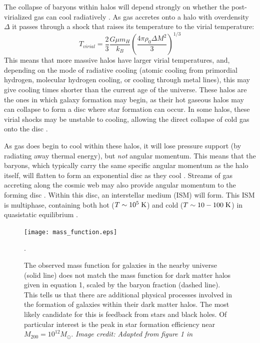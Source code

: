 The collapse of baryons within halos will depend strongly on whether the
post-virialized gas can cool radiatively \citep{Rees1977}.  As gas accretes onto
a halo with overdensity $\Delta$ it passes through a shock that raises its
temperature to the virial temperature:
\begin{equation}
    T_{virial} = \frac{2}{3}\frac{G\mu m_H}{k_B}\left({\frac{4\pi\rho_0\Delta
    M^2}{3}}\right)^{1/3}
\end{equation}
This means that more massive halos have larger virial temperatures, and,
depending on the mode of radiative cooling (atomic cooling from primordial
hydrogen, molecular hydrogen cooling, or cooling through metal lines), this may
give cooling times shorter than the current age of the universe.  These halos 
are the ones in which galaxy formation may begin, as their hot gaseous halos may
can collapse to form a disc where star formation can occur.  In some halos,
these virial shocks may be unstable to cooling, allowing the direct collapse of
cold gas onto the disc \citep{Birnboim2003}.  


As gas does begin to cool within these halos, it will lose pressure support (by
radiating away thermal energy), but {\it not} angular momentum.  This means that
the baryons, which typically carry the same specific angular momentum as the
halo itself, will flatten to form an exponential disc as they cool
\citep{Fall1980,Mo1998}.  Streams of gas accreting along the cosmic web may also
provide angular momentum to the forming disc \citep{Dekel2006}.  Within this
disc, an interstellar medium (ISM) will form.  This ISM is multiphase,
containing both hot ($T\sim10^5\;\rm{K}$) and cold ($T\sim10-100\;\rm{K}$) in
quasistatic equilibrium \citep{McKee1977}.
\begin{figure}
    \texttt{[image: mass\_function.eps]}
    \caption[Galaxy mass function]{The observed mass function for galaxies in
    the nearby universe (solid line) does not match the mass function for dark
    matter halos given in equation 1, scaled by the baryon fraction (dashed
    line).  This tells us that there are additional physical processes involved
    in the formation of galaxies within their dark matter halos.  The most
    likely candidate for this is feedback from stars and black holes.  Of
    particular interest is the peak in star formation efficiency near
    $M_{200}=10^{12}M_\odot$.  \textit{Image credit: Adapted from figure 1 in
    \citet{Ferrero2012}}}.
\end{figure}

